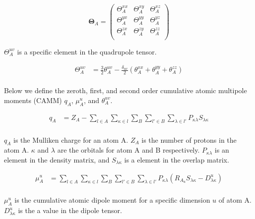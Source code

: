 \begin{equation}
    \pmb{\Theta}_A = 
    \begin{pmatrix}
        \Theta_A^{xx} & \Theta_A^{xy} & \Theta_A^{xz}\\
        \Theta_A^{yx} & \Theta_A^{yy} & \Theta_A^{yz}\\
        \Theta_A^{zx} & \Theta_A^{zy} & \Theta_A^{zz}\\
    \end{pmatrix}
\end{equation}

$\Theta_A^{uv}$ is a specific element in the quadrupole tensor.

\begin{equation}
\begin{split}
        \Theta_A^{uv} &= \frac{3}{2} \theta_A^{uv} - \frac{\delta_{uv}}{2} (\theta_A^{xx} + \theta_A^{yy} + \theta_A^{zz})\\
\end{split}
\end{equation}


Below we define the zeroth, first, and second order cumulative atomic multipole moments (CAMM) $q_A$, $\mu_A^u$, and $\theta_A^{uv}$.

\begin{equation}
\begin{split}
        q_A &= Z_A - \sum_{l \in A} \sum_{\kappa \in l} \sum_{B} \sum_{l' \in B} \sum_{\lambda \in l'} P_{\kappa \lambda} S_{\lambda \kappa}\\
\end{split}
\end{equation}

$q_A$ is the Mulliken charge for an atom A. $Z_A$ is the number of protons in the atom A. $\kappa$ and $\lambda$ are the orbitals for atom A and B respectively. $P_{\kappa \lambda}$ is an element in the density matrix, and $S_{\lambda \kappa}$ is a element in the overlap matrix.

\begin{equation}
\begin{split}
        \mu_A^u &= \sum_{l \in A} \sum_{\kappa \in l} \sum_{B} \sum_{l' \in B} \sum_{\lambda \in l'} P_{\kappa \lambda} (R_{A_u} S_{\lambda \kappa} - D_{\lambda \kappa}^u)\\
\end{split}
\end{equation}

$\mu_A^u$ is the cumulative atomic dipole moment for a specific dimension $u$ of atom A. $D_{\lambda \kappa}^u$ is the a value in the dipole tensor.

